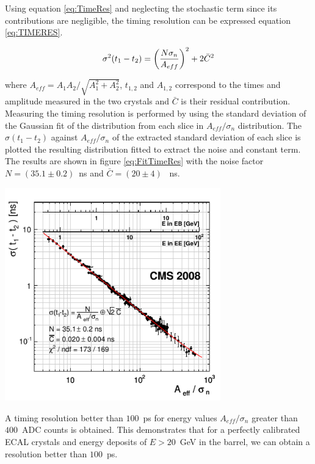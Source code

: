 Using equation \ref{eq:TimeRes} and neglecting the stochastic term since its contributions are negligible, the timing resolution can be expressed  equation \ref{eq:TIMERES}.
 
 \begin{equation}{\label{eq:TIMERES}}
 \sigma^{2}(t_{1} - t_{2}) = \left(\frac{N\sigma_{n}}{A_{eff}}\right)^{2} + 2\bar{C}^{2}
 \end{equation}
 
 where $A_{eff} = A_{1}A_{2}/\sqrt{A^{2}_{1} + A^{2}_{2}}$, $t_{1,2}$ and $A_{1,2}$ correspond to the times and amplitude measured in the two crystals and $\bar{C}$ is their residual contribution.
Measuring the timing resolution is performed by using the standard deviation of the Gaussian fit of the distribution from each slice in $A_{eff}/\sigma_{n}$ distribution. The $\sigma(t_{1} - t_{2})$ against $A_{eff}/\sigma_{n}$ of the extracted standard deviation of each slice is plotted the resulting distribution fitted to extract the noise and constant term. The results are shown in figure \ref{eq:FitTimeRes} with the noise factor $N = (35.1 \pm 0.2)$~ns and $\bar{C} = (20 \pm 4)$ ~ns. 

\begin{center}
\centering
\mbox{\includegraphics[height=0.6\textwidth, width=0.7\textwidth]{THESISPLOTS/ECAL_Timing_Resolution.png}}
\label{fig:FitTimeRes}
\end{center}
A timing resolution better than $100$~ps for energy values $A_{eff}/\sigma_{n}$ greater than $400$~ADC counts is obtained. This demonstrates that for a perfectly calibrated ECAL crystals and energy deposits of $E > 20$~GeV in the barrel, we can obtain a resolution better than $100$~ps. 

